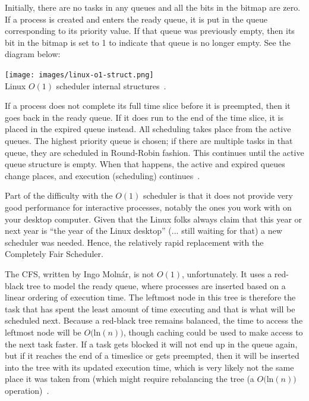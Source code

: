 Initially, there are no tasks in any queues and all the bits in the bitmap are zero. If a process is created and enters the ready queue, it is put in the queue corresponding to its priority value. If that queue was previously empty, then its bit in the bitmap is set to 1 to indicate that queue is no longer empty. See the diagram below:

\begin{center}
	\texttt{[image: images/linux-o1-struct.png]}\\
	Linux $O(1)$ scheduler internal structures~\cite{osi}.
\end{center}

If a process does not complete its full time slice before it is preempted, then it goes back in the ready queue. If it does run to the end of the time slice, it is placed in the expired queue instead. All scheduling takes place from the active queues. The highest priority queue is chosen; if there are multiple tasks in that queue, they are scheduled in Round-Robin fashion. This continues until the active queue structure is empty. When that happens, the active and expired queues change places, and execution (scheduling) continues~\cite{osi}.

Part of the difficulty with the $O(1)$ scheduler is that it does not provide very good performance for interactive processes, notably the ones you work with on your desktop computer. Given that the Linux folks always claim that this year or next year is ``the year of the Linux desktop'' (... still waiting for that) a new scheduler was needed. Hence, the relatively rapid replacement with the Completely Fair Scheduler.

The CFS, written by Ingo Moln\'ar, is not $O(1)$, unfortunately. It uses a red-black tree to model the ready queue, where processes are inserted based on a linear ordering of execution time. The leftmost node in this tree is therefore the task that has spent the least amount of time executing and that is what will be scheduled next. Because a red-black tree remains balanced, the time to access the leftmost node will be $O($ln$(n))$, though caching could be used to make access to the next task faster. If a task gets blocked it will not end up in the queue again, but if it reaches the end of a timeslice or gets preempted, then it will be inserted into the tree with its updated execution time, which is very likely not the same place it was taken from (which might require rebalancing the tree (a $O($ln$(n))$ operation)~\cite{mte241}.

